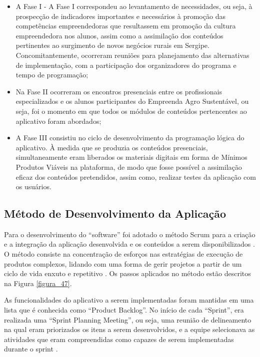 \begin{itemize}

\item{A Fase I - A Fase I correspondeu ao levantamento de necessidades, ou seja, à prospecção de indicadores importantes e necessários à promoção das competências empreendedoras que resultassem em promoção da cultura empreendedora nos alunos, assim como a assimilação dos conteúdos pertinentes ao surgimento de novos negócios rurais em Sergipe. Concomitantemente, ocorreram reuniões para planejamento das alternativas de implementação, com a participação dos organizadores do programa e tempo de programação;}

\item{Na Fase II ocorreram os encontros presenciais entre os profissionais especializados e os alunos participantes do Empreenda Agro Sustentável, ou seja, foi o momento em que todos os módulos de conteúdos pertencentes ao aplicativo foram abordados;}

\item{A Fase III consistiu no ciclo de desenvolvimento da programação lógica do aplicativo. À medida que se produzia os conteúdos presenciais, simultaneamente eram liberados os materiais digitais em forma de Mínimos Produtos Viáveis na plataforma, de modo que fosse possível a assimilação eficaz dos conteúdos pretendidos, assim como, realizar testes da aplicação com os usuários.}

\end{itemize}

\subsection{Método de Desenvolvimento da Aplicação}

Para o desenvolvimento do “software” foi adotado o método Scrum para a criação e a integração da aplicação desenvolvida e os conteúdos a serem disponibilizados \cite{schwalbe_scrum_2017}. O método consiste na concentração de esforços nas estratégias de execução de produtos complexos, lidando com uma forma de gerir projetos a partir de um ciclo de vida enxuto e repetitivo \cite{bernardo_framework_2019}. Os passos aplicados no método estão descritos na Figura \ref{figura_47}.

As funcionalidades do aplicativo a serem implementadas foram mantidas em uma lista que é conhecida como “Product Backlog”. No início de cada “Sprint”, era realizada uma “Sprint Planning Meeting”, ou seja, uma reunião de delineamento na qual eram priorizados os itens a serem desenvolvidos, e a equipe selecionava as atividades que eram compreendidas como capazes de serem implementadas durante o sprint \cite{trainning_education_services_curso_2018}.

